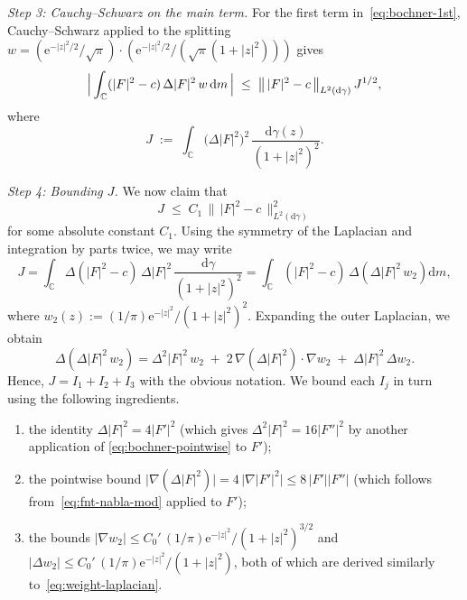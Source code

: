 \documentclass[a4paper,11pt,reqno]{amsart}
\numberwithin{equation}{section}
\theoremstyle{plain} %
\theoremstyle{definition} %
\theoremstyle{remark}
\newcommand{\C}{\mathbb{C}}
\newcommand{\abs}[1]{\lvert #1 \rvert}
\newcommand{\dd}{\mathrm{d}}
\newcommand{\ee}{\mathrm{e}}
\begin{document}
\medskip
\noindent\emph{Step 3: Cauchy--Schwarz on the main term.}\;
For the first term in~\eqref{eq:bochner-1st}, Cauchy--Schwarz applied
to the splitting $w = (\ee^{-\abs{z}^2/2}/\sqrt{\pi}) \cdot
(\ee^{-\abs{z}^2/2}/(\sqrt{\pi}(1+\abs{z}^2)))$ gives
\begin{equation}\label{eq:bochner-CS}
\Bigl|\,\int_{\C} (\abs{F}^2-c)\, \Delta\abs{F}^2\, w\, \dd m \,\Bigr|
\;\le\;
\bigl\|\,\abs{F}^2 - c\,\bigr\|_{L^2(\dd\gamma)}\, J^{1/2},
\end{equation}
where
\begin{equation}\label{eq:J-def}
J \;:=\; \int_{\C} \bigl(\Delta\abs{F}^2\bigr)^2\,
\frac{\dd\gamma(z)}{(1+\abs{z}^2)^2}.
\end{equation}

\medskip
\noindent\emph{Step 4: Bounding $J$.}\;
We now claim that
\begin{equation}\label{eq:J-bound}
J \;\le\; C_1\, \bigl\|\,\abs{F}^2 - c\,\bigr\|_{L^2(\dd\gamma)}^2
\end{equation}
for some absolute constant $C_1$. Using the symmetry of the
Laplacian and integration by parts twice, we may write
\[
J
= \int_{\C} \Delta(\abs{F}^2 - c)\, \Delta\abs{F}^2\,
\frac{\dd\gamma}{(1+\abs{z}^2)^2}
= \int_{\C} (\abs{F}^2 - c)\,
\Delta\!\left(\Delta\abs{F}^2\, w_2\right) \dd m,
\]
where $w_2(z) := (1/\pi)\ee^{-\abs{z}^2}/(1+\abs{z}^2)^2$. Expanding the
outer Laplacian, we obtain
\[
\Delta\!\left(\Delta\abs{F}^2\, w_2\right)
= \Delta^2\abs{F}^2\, w_2
\;+\; 2\, \nabla(\Delta\abs{F}^2) \cdot \nabla w_2
\;+\; \Delta\abs{F}^2\, \Delta w_2.
\]
Hence, $J = I_1 + I_2 + I_3$ with the obvious notation. We bound each
$I_j$ in turn using the following ingredients.
\begin{enumerate}[leftmargin=2em]
    \item[(i)] the identity $\Delta\abs{F}^2 = 4\abs{F'}^2$ (which gives
    $\Delta^2\abs{F}^2 = 16\abs{F''}^2$ by another application of
    \eqref{eq:bochner-pointwise} to $F'$);
    \item[(ii)] the pointwise bound $\bigl|\nabla(\Delta\abs{F}^2)\bigr|
    = 4\,\abs{\nabla\abs{F'}^2} \le 8\,\abs{F'}\abs{F''}$
    (which follows from~\eqref{eq:fnt-nabla-mod} applied to $F'$);
    \item[(iii)] the bounds $\abs{\nabla w_2} \le C_0'\,
    (1/\pi)\ee^{-\abs{z}^2}/(1+\abs{z}^2)^{3/2}$ and
    $\abs{\Delta w_2} \le C_0'\,
    (1/\pi)\ee^{-\abs{z}^2}/(1+\abs{z}^2)$, both of which are derived
    similarly to~\eqref{eq:weight-laplacian}.
\end{enumerate}
\end{document}
